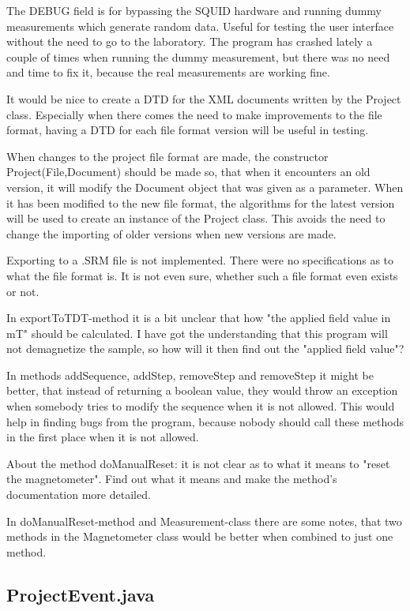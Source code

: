 The DEBUG field is for bypassing the SQUID hardware and running dummy measurements which generate random data. Useful for testing the user interface without the need to go to the laboratory. The program has crashed lately a couple of times when running the dummy measurement, but there was no need and time to fix it, because the real measurements are working fine.

It would be nice to create a DTD for the XML documents written by the Project class. Especially when there comes the need to make improvements to the file format, having a DTD for each file format version will be useful in testing.

When changes to the project file format are made, the constructor Project(File,Document) should be made so, that when it encounters an old version, it will modify the Document object that was given as a parameter. When it has been modified to the new file format, the algorithms for the latest version will be used to create an instance of the Project class. This avoids the need to change the importing of older versions when new versions are made.

Exporting to a .SRM file is not implemented. There were no specifications as to what the file format is. It is not even sure, whether such a file format even exists or not.

In exportToTDT-method it is a bit unclear that how "the applied field value in mT" should be calculated. I have got the understanding that this program will not demagnetize the sample, so how will it then find out the "applied field value"?

In methods addSequence, addStep, removeStep and removeStep it might be better, that instead of returning a boolean value, they would throw an exception when somebody tries to modify the sequence when it is not allowed. This would help in finding bugs from the program, because nobody should call these methods in the first place when it is not allowed.

About the method doManualReset: it is not clear as to what it means to "reset the magnetometer". Find out what it means and make the method's documentation more detailed.

In doManualReset-method and Measurement-class there are some notes, that two methods in the Magnetometer class would be better when combined to just one method.


\subsection{ProjectEvent.java}

